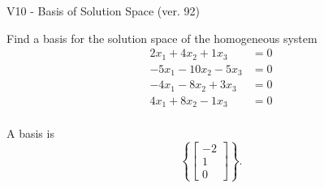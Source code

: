 \begin{exercise}
  \begin{exerciseTitle}V10 - Basis of Solution Space (ver. 92)\end{exerciseTitle}
  \begin{exerciseStatement}
    Find a basis for the solution space of the homogeneous system 
\begin{align*}
 2 x_ 1 + 4 x_ 2 + 1 x_ 3 &= 0  \\ 
  -5 x_ 1 -10 x_ 2 -5 x_ 3 &= 0  \\ 
  -4 x_ 1 -8 x_ 2 + 3 x_ 3 &= 0  \\ 
  4 x_ 1 + 8 x_ 2 -1 x_ 3 &= 0  \\ 
 \end{align*}


 
  \end{exerciseStatement}

  \begin{exerciseAnswer}
   A basis is   
\[\left\{\left[\begin{array}{c}
-2 \\
1 \\
0
\end{array}\right]\right\}.\]

  


  \end{exerciseAnswer}
\end{exercise}